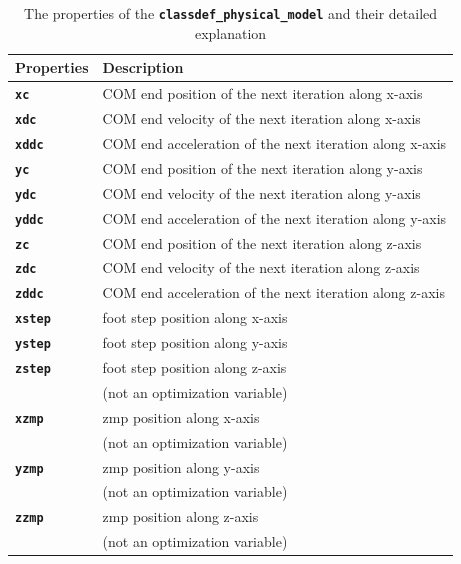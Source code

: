 \documentclass[12pt,oneside,notitlepage,abstracton,a4paper]{scrartcl}
\begin{document}
\begin{table}[!htbp] 
\begin{center}
\begin{tabular}{|l|l|}
  \hline
  \rowcolor{green!25}\bf {\small Properties}      & \bf {\small Description}  \\ \hline 
 \textbf{\texttt{xc}}         & COM end position of the next iteration along x-axis \\ \hline 
 \textbf{\texttt{xdc}}         & COM end velocity of the next iteration along x-axis \\ \hline 
 \textbf{\texttt{xddc}}         &  COM end acceleration of the next iteration along x-axis\\ \hline
 \textbf{\texttt{yc}}         & COM end position of the next iteration along y-axis \\ \hline 
 \textbf{\texttt{ydc}}         & COM end velocity of the next iteration along y-axis \\ \hline 
 \textbf{\texttt{yddc}}         &  COM end acceleration of the next iteration along y-axis\\ \hline
 \textbf{\texttt{zc}}         & COM end position of the next iteration along z-axis \\ \hline 
 \textbf{\texttt{zdc}}         & COM end velocity of the next iteration along z-axis \\ \hline 
 \textbf{\texttt{zddc}}         &  COM end acceleration of the next iteration along z-axis\\ \hline 
 \textbf{\texttt{xstep}}         & foot step position along x-axis \\ \hline 
 \textbf{\texttt{ystep}}         &  foot step position along y-axis\\ \hline 
 \textbf{\texttt{zstep}}         & foot step position along z-axis \\   
                                 & (not an optimization variable) \\ \hline 
 \textbf{\texttt{xzmp}}         & zmp position along x-axis \\   
                                 & (not an optimization variable) \\ \hline 
 \textbf{\texttt{yzmp}}         & zmp position along y-axis \\   
                                 & (not an optimization variable) \\ \hline 
 \textbf{\texttt{zzmp}}         & zmp position along z-axis \\   
                                 & (not an optimization variable) \\ \hline  
\end{tabular}
\caption {The properties of the \textbf{\texttt{classdef\_physical\_model}} and their detailed explanation}
\label{tbl:paras6}
\end{center}
\end{table}
\end{document}
